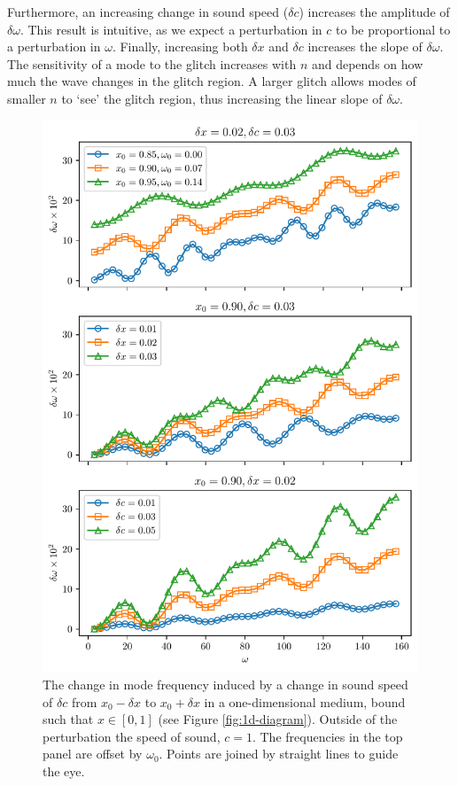 Furthermore, an increasing change in sound speed (\(\delta c\)) increases the amplitude of \(\delta\omega\). This result is intuitive, as we expect a perturbation in \(c\) to be proportional to a perturbation in \(\omega\). Finally, increasing both \(\delta x\) and \(\delta c\) increases the slope of \(\delta\omega\). The sensitivity of a mode to the glitch increases with \(n\) and depends on how much the wave changes in the glitch region. A larger glitch allows modes of smaller \(n\) to `see' the glitch region, thus increasing the linear slope of \(\delta\omega\).

\begin{figure}
    \centering
    \includegraphics{figures/glitch-1d-example-results.pdf}
    \caption{The change in mode frequency induced by a change in sound speed of \(\delta c\) from \(x_0 - \delta x\) to \(x_0 + \delta x\) in a one-dimensional medium, bound such that \(x \in [0, 1]\) (see Figure \ref{fig:1d-diagram}). Outside of the perturbation the speed of sound, \(c=1\).
    The frequencies in the top panel are offset by \(\omega_0\).
    Points are joined by straight lines to guide the eye.
    }
    \label{fig:1d-results}
\end{figure}

